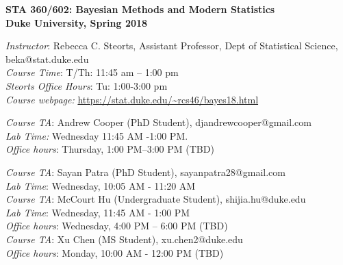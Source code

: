 \documentclass[11pt]{article}
\date{}
\begin{document}
\begin{center}
{\Large\bf STA 360/602: Bayesian Methods and Modern Statistics} \\

{\Large\bf Duke University, Spring 2018} \\
\end{center}

\emph{Instructor}: Rebecca C. Steorts,  Assistant Professor, Dept of Statistical Science, beka@stat.duke.edu\\
\emph{Course Time}: T/Th: 11:45 am -- 1:00 pm\\
\emph{Steorts Office Hours}: Tu: 1:00-3:00 pm \\
\emph{Course webpage:} \url{https://stat.duke.edu/~rcs46/bayes18.html} \\
\vspace*{1em}

\emph{Course TA}:  Andrew Cooper (PhD Student), djandrewcooper@gmail.com\\
\emph{Lab Time:} Wednesday 11:45 AM -1:00 PM.\\
\emph{Office hours}: Thursday, 1:00 PM--3:00 PM (TBD)\\
\vspace*{1em}

\emph{Course TA}: Sayan Patra (PhD Student), sayanpatra28@gmail.com \\
\emph{Lab Time}: Wednesday, 10:05 AM - 11:20 AM \\

\emph{Course TA}: McCourt Hu (Undergraduate Student), shijia.hu@duke.edu\\
\emph{Lab Time}: Wednesday, 11:45 AM - 1:00 PM\\
\emph{Office hours}: Wednesday, 4:00 PM -- 6:00 PM (TBD)\\

\emph{Course TA}: Xu Chen (MS Student), xu.chen2@duke.edu \\
\emph{Office hours}: Monday, 10:00 AM - 12:00 PM (TBD)\\
\end{document}
